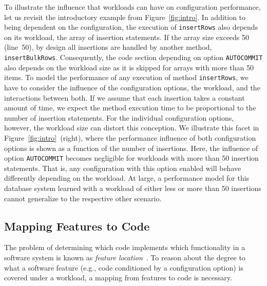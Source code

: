 To illustrate the influence that workloads can have on
configuration performance, let us revisit the introductory example from Figure~\ref{fig:intro}. In addition to being dependent on the configuration, the execution of \texttt{insertRows} also depends on its workload,  the array of insertion statements. If the array size exceeds 50 (line~50), by design all insertions are handled by another method, \texttt{insertBulkRows}. Consequently, the code section depending on option \texttt{AUTOCOMMIT} also depends on the workload size as it is skipped for arrays with more than 50 items. 
To model the performance of any execution of method \texttt{insertRows}, we have to consider the influence of the configuration options, the workload, and the interactions between both. If we assume that each insertion takes a constant amount of time, we expect the method execution time to be proportional to the number of insertion statements. For the individual configuration options, however, the workload size can distort this conception. We illustrate this facet in Figure~\ref{fig:intro}~(right), where the performance influence of both configuration options is shown as a function of the number of insertions. Here, the influence of option \texttt{AUTOCOMMIT} becomes negligible for workloads with more than 50 insertion statements. That is, any configuration  with this option enabled will behave differently depending on the workload. At large, a performance model for this database system learned with a workload of either less or more than 50 insertions cannot generalize to the respective other scenario.


\subsection{Mapping Features to Code}\label{sec:feature_location}
The problem of determining which code implements which functionality in a software system is known as \emph{feature location}~\cite{rubin_feature_2013}. To reason about the degree to what a software feature (e.g., code conditioned by a configuration option) is covered under a workload, a mapping from features to code is necessary. 

